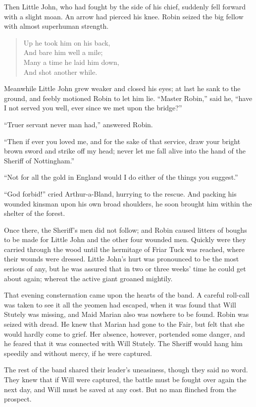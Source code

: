 Then Little John, who had fought by the side of his chief, suddenly fell
forward with a slight moan. An arrow had pierced his knee. Robin seized
the big fellow with almost superhuman strength.

\begin{quote}
Up he took him on his back,\\
And bare him well a mile;\\
Many a time he laid him down,\\
And shot another while.
\end{quote}

Meanwhile Little John grew weaker and closed his eyes; at last he sank
to the ground, and feebly motioned Robin to let him lie. ``Master
Robin,'' said he, ``have I not served you well, ever since we met upon
the bridge?''

``Truer servant never man had,'' answered Robin.

``Then if ever you loved me, and for the sake of that service, draw your
bright brown sword and strike off my head; never let me fall alive into
the hand of the Sheriff of Nottingham.''

``Not for all the gold in England would I do either of the things you
suggest.''

``God forbid!'' cried Arthur-a-Bland, hurrying to the rescue. And
packing his wounded kinsman upon his own broad shoulders, he soon
brought him within the shelter of the forest.

Once there, the Sheriff's men did not follow; and Robin caused litters
of boughs to be made for Little John and the other four wounded men.
Quickly were they carried through the wood until the hermitage of Friar
Tuck was reached, where their wounds were dressed. Little John's hurt
was pronounced to be the most serious of any, but he was assured that in
two or three weeks' time he could get about again; whereat the active
giant groaned mightily.

That evening consternation came upon the hearts of the band. A careful
roll-call was taken to see it all the yeomen had escaped, when it was
found that Will Stutely was missing, and Maid Marian also was nowhere to
be found. Robin was seized with dread. He knew that Marian had gone to
the Fair, but felt that she would hardly come to grief. Her absence,
however, portended some danger, and he feared that it was connected with
Will Stutely. The Sheriff would hang him speedily and without mercy, if
he were captured.

The rest of the band shared their leader's uneasiness, though they said
no word. They knew that if Will were captured, the battle must be fought
over again the next day, and Will must be saved at any cost. But no man
flinched from the prospect.

